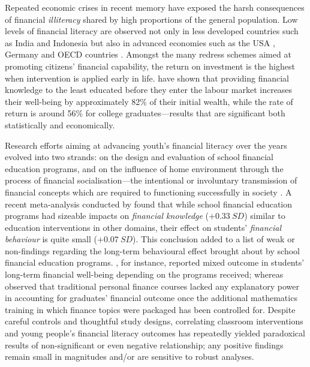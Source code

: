 \documentclass[a4paper,11pt,UKenglish,twoside,openright]{report}\usepackage[]{graphicx}\usepackage[]{color}
\begin{document}
Repeated economic crises in recent memory have exposed the harsh consequences of financial \emph{illiteracy} shared by high proportions of the general population. Low levels of financial literacy are observed not only in less developed countries such as India and Indonesia \parencite{cole:2009} but also in advanced economies such as the USA \parencite{huston:2012}, Germany \parencite{bucherkoenen:2016} and OECD countries \parencite{lusardi:2015a}. Amongst the many redress schemes aimed at promoting citizens' financial capability, the return on investment is the highest when intervention is applied early in life. \textcite{lusardi:2014} have shown that providing financial knowledge to the least educated before they enter the labour market increases their well-being by approximately 82\% of their initial wealth, while the rate of return is around 56\% for college graduates---results that are significant both statistically and economically.

Research efforts aiming at advancing youth's financial literacy over the years evolved into two strands: on the design and evaluation of school financial education programs, and on the influence of home environment through the process of financial socialisation---the intentional or involuntary transmission of financial concepts which are required to functioning successfully in society \parencite{bowen:2002}. A recent meta-analysis conducted by \textcite{kaiser:2020} found that while school financial education programs had sizeable impacts on \emph{financial knowledge} ($+0.33\ SD$) similar to education interventions in other domains, their effect on students' \emph{financial behaviour} is quite small ($+0.07\ SD$). This conclusion added to a list of weak or non-findings regarding the long-term behavioural effect brought about by school financial education programs. \textcite{brown:2016}, for instance, reported mixed outcome in students' long-term financial well-being depending on the programs received; whereas \textcite{cole:2016} observed that traditional personal finance courses lacked any explanatory power in accounting for graduates' financial outcome once the additional mathematics training in which finance topics were packaged has been controlled for. Despite careful controls and thoughtful study designs, correlating classroom interventions and young people's financial literacy outcomes has repeatedly yielded paradoxical results of non-significant or even negative relationship; any positive findings remain small in magnitudes and/or are sensitive to robust analyses.
\end{document}
